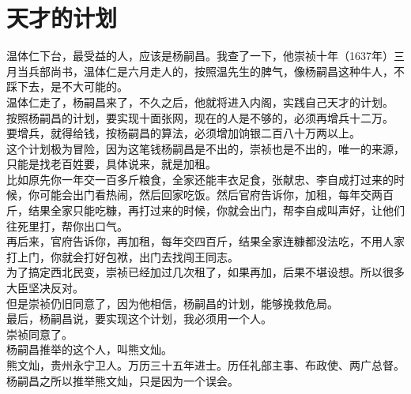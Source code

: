 \section{天才的计划}
\ifnum{}
	\begin{multicols}{\theparacolNo}
\fi
温体仁下台，最受益的人，应该是杨嗣昌。我查了一下，他崇祯十年（1637年）三月当兵部尚书，温体仁是六月走人的，按照温先生的脾气，像杨嗣昌这种牛人，不踩下去，是不大可能的。\\

温体仁走了，杨嗣昌来了，不久之后，他就将进入内阁，实践自己天才的计划。\\

按照杨嗣昌的计划，要实现十面张网，现在的人是不够的，必须再增兵十二万。\\

要增兵，就得给钱，按杨嗣昌的算法，必须增加饷银二百八十万两以上。\\

这个计划极为冒险，因为这笔钱杨嗣昌是不出的，崇祯也是不出的，唯一的来源，只能是找老百姓要，具体说来，就是加租。\\

比如原先你一年交一百多斤粮食，全家还能丰衣足食，张献忠、李自成打过来的时候，你可能会出门看热闹，然后回家吃饭。然后官府告诉你，加租，每年交两百斤，结果全家只能吃糠，再打过来的时候，你就会出门，帮李自成叫声好，让他们往死里打，帮你出口气。\\

再后来，官府告诉你，再加租，每年交四百斤，结果全家连糠都没法吃，不用人家打上门，你就会打好包袱，出门去找闯王同志。\\

为了搞定西北民变，崇祯已经加过几次租了，如果再加，后果不堪设想。所以很多大臣坚决反对。\\

但是崇祯仍旧同意了，因为他相信，杨嗣昌的计划，能够挽救危局。\\

最后，杨嗣昌说，要实现这个计划，我必须用一个人。\\

崇祯同意了。\\

杨嗣昌推举的这个人，叫熊文灿。\\

熊文灿，贵州永宁卫人。万历三十五年进士。历任礼部主事、布政使、两广总督。\\

杨嗣昌之所以推举熊文灿，只是因为一个误会。\\


\end{multicols}
